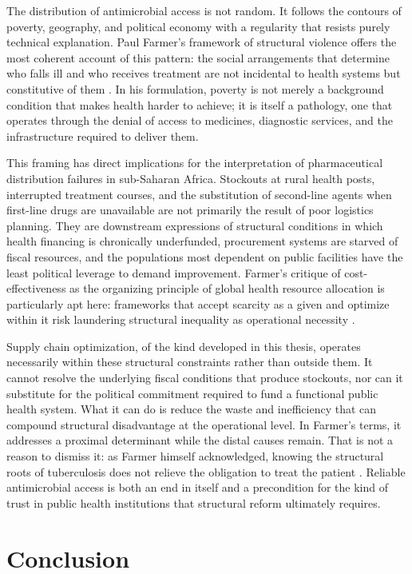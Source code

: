 \documentclass{article}
\begin{document}
The distribution of antimicrobial access is not random. It follows the contours of poverty, geography, and political economy with a regularity that resists purely technical explanation. Paul Farmer's framework of structural violence offers the most coherent account of this pattern: the social arrangements that determine who falls ill and who receives treatment are not incidental to health systems but constitutive of them \cite{farmer2006}. In his formulation, poverty is not merely a background condition that makes health harder to achieve; it is itself a pathology, one that operates through the denial of access to medicines, diagnostic services, and the infrastructure required to deliver them.

This framing has direct implications for the interpretation of pharmaceutical distribution failures in sub-Saharan Africa. Stockouts at rural health posts, interrupted treatment courses, and the substitution of second-line agents when first-line drugs are unavailable are not primarily the result of poor logistics planning. They are downstream expressions of structural conditions in which health financing is chronically underfunded, procurement systems are starved of fiscal resources, and the populations most dependent on public facilities have the least political leverage to demand improvement. Farmer's critique of cost-effectiveness as the organizing principle of global health resource allocation is particularly apt here: frameworks that accept scarcity as a given and optimize within it risk laundering structural inequality as operational necessity \cite{farmer2004}.

Supply chain optimization, of the kind developed in this thesis, operates necessarily within these structural constraints rather than outside them. It cannot resolve the underlying fiscal conditions that produce stockouts, nor can it substitute for the political commitment required to fund a functional public health system. What it can do is reduce the waste and inefficiency that can compound structural disadvantage at the operational level. In Farmer's terms, it addresses a proximal determinant while the distal causes remain. That is not a reason to dismiss it: as Farmer himself acknowledged, knowing the structural roots of tuberculosis does not relieve the obligation to treat the patient \cite{farmer2006}. Reliable antimicrobial access is both an end in itself and a precondition for the kind of trust in public health institutions that structural reform ultimately requires.

\section{Conclusion}
\end{document}
